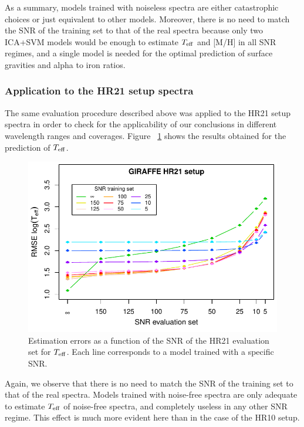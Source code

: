 \documentclass[a4paper,fleqn,usenatbib]{mnras}
\begin{document}
{{{As a summary, models trained with noiseless spectra are either 
catastrophic choices or just equivalent to other models. Moreover, 
there is no need to match the SNR of the training set to that of the 
real spectra because only two ICA+SVM models would be enough to 
estimate $T_{\rm eff}$ and [M/H] in all SNR regimes, and a single 
model is needed for the optimal prediction of surface gravities and 
alpha to iron ratios.

\subsubsection{Application to the HR21 setup spectra}

The same evaluation procedure described above was applied to the 
HR21 setup spectra in order to check for the applicability of our 
conclusions in different wavelength ranges and coverages. Figure ~\ref{fig:snrtrainhr21} 
shows the results obtained for the prediction of $T_{\rm eff}$.

\begin{figure}
	\centering\includegraphics[width=\columnwidth]{snr_errors_log_global_HR21.pdf}
	\caption{Estimation errors as a function of the SNR of the HR21 evaluation 
		set for $T_{\rm eff}$. Each line corresponds 
		to a model trained with a specific SNR.}
	\label{fig:snrtrainhr21}
\end{figure}

Again, we observe that there is no need to match 
the SNR of the training set to that of the real spectra. Models 
trained with noise-free spectra are only adequate to 
estimate $T_{\rm eff}$ of noise-free spectra, and completely 
useless in any other SNR regime. This effect is much more evident 
here than in the case of the HR10 setup. 

}}}
\end{document}
